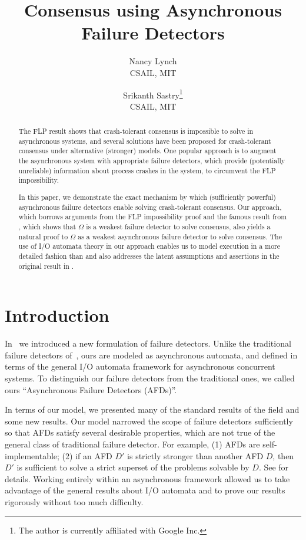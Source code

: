 \documentclass[11pt]{article}
\title{Consensus using Asynchronous Failure Detectors}
\author{Nancy Lynch \\
CSAIL, MIT
\and Srikanth Sastry\footnote{The author is currently affiliated with Google Inc.}\\
CSAIL, MIT}
\date{}
\numberwithin{theorem}{section}
\begin{document}
\maketitle

\begin{abstract}
The FLP result shows that crash-tolerant consensus is impossible to solve in asynchronous systems, and several solutions have been proposed for crash-tolerant consensus under alternative (stronger) models. One popular approach is to augment the asynchronous system with appropriate failure detectors, which provide (potentially unreliable) information about process crashes in the system, to circumvent the FLP impossibility.  

In this paper, we demonstrate the exact mechanism by which (sufficiently powerful) asynchronous failure detectors enable solving crash-tolerant consensus. Our approach, which borrows arguments from the FLP impossibility proof and the famous result from \cite{chan:twfdf}, which shows that $\Omega$ is a weakest failure detector to solve consensus, also yields a natural proof to $\Omega$ as a weakest asynchronous failure detector to solve consensus. The use of I/O automata theory in our approach enables us to model execution in a more detailed fashion than \cite{chan:twfdf} and also addresses the latent assumptions and assertions in the original result in \cite{chan:twfdf}.
\end{abstract}

\section{Introduction}



In~\cite{cornejoetalAFD,cornejoetalAFD-TR}
we introduced a new formulation of failure detectors.  Unlike the
traditional failure detectors of~\cite{chan:ufdfr, chan:twfdf}, ours are modeled as
asynchronous automata, and defined in terms of the general I/O
automata framework for asynchronous concurrent systems.
To distinguish our failure detectors from the traditional ones, we
called ours ``Asynchronous Failure Detectors (AFDs)''.

In terms of our model, we presented many of the standard results of
the field and some new results.
Our model narrowed the scope of failure detectors sufficiently so that
AFDs satisfy several desirable properties, which are not true of the
general class of traditional failure detector. For example,
(1) AFDs are self-implementable; (2) if an AFD $D'$ is strictly stronger
than another AFD $D$, then $D'$ is sufficient to solve a strict superset
of the problems solvable by $D$. See \cite{cornejoetalAFD-TR} for details. 
Working entirely within an asynchronous framework allowed us to take
advantage of the general results about I/O automata and to prove
our results rigorously without too much difficulty.
\end{document}
